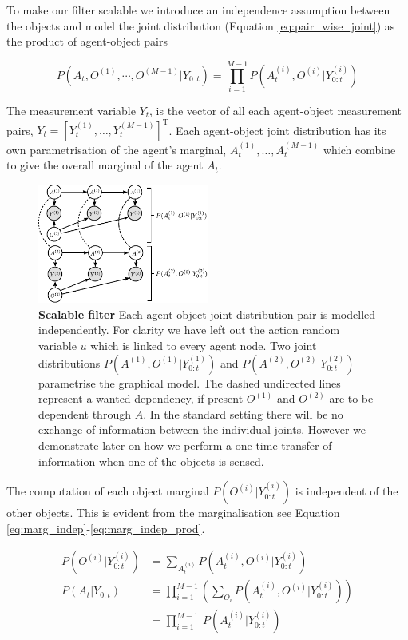 To make our filter scalable we introduce an independence assumption between the objects and model the joint distribution (Equation \ref{eq:pair_wise_joint}) as the product 
of agent-object pairs

\begin{equation}\label{eq:pair_wise_joint}
 P(A_t,O^{(1)},\cdots,O^{(M-1)}|Y_{0:t}) = \prod\limits_{i=1}^{M-1} P(A^{(i)}_t,O^{(i)}|Y^{(i)}_{0:t})
\end{equation}

The measurement variable $Y_t$, is the vector of all each agent-object 
measurement pairs, $Y_t = \left[Y^{(1)}_t,\dots,Y^{(M-1)}_t\right]^{\mathrm{T}}$. Each agent-object joint distribution has its own parametrisation of the agent's marginal,
$A^{(1)}_t,\dots,A^{(M-1)}_t$ which combine to give the overall marginal of the agent $A_t$.

\begin{figure}
\centering
  \includegraphics[width=0.5\textwidth]{./ch5-MLMF/Figures/Figure9.pdf}
  \caption{\textbf{Scalable filter} Each agent-object joint distribution pair is modelled independently. For clarity we have left 
  out the action random variable $u$ which is linked to every agent node.
  Two joint distributions $P(A^{(1)},O^{(1)}|Y^{(1)}_{0:t})$   and $P(A^{(2)},O^{(2)}|Y^{(2)}_{0:t})$ parametrise the graphical model. 
  The dashed undirected lines represent a wanted dependency, if present $O^{(1)}$ and $O^{(2)}$ are to be dependent through $A$. In
  the standard setting there will be no exchange of information between the individual joints. However we demonstrate later on how
  we perform a one time transfer of information when one of the objects is sensed.}
  \label{fig:scalable_mlmf_dae}
\end{figure}

The computation of each object marginal $P(O^{(i)}|Y^{(i)}_{0:t})$ is independent of the other objects. This is evident from the marginalisation 
see Equation \ref{eq:marg_indep}-\ref{eq:marg_indep_prod}.

\begin{align}
 P(O^{(i)}|Y^{(i)}_{0:t}) &= \sum\limits_{A^{(i)}_t} P(A^{(i)}_t,O^{(i)}|Y^{(i)}_{0:t}) \label{eq:marg_indep} \\
 P(A_t|Y_{0:t})   &= \prod\limits_{i=1}^{M-1} \left(\sum\limits_{O_i} P(A^{(i)}_t,O^{(i)}|Y^{(i)}_{0:t})\right)  \\
	    &= \prod\limits_{i=1}^{M-1} \ P(A^{(i)}_t|Y^{(i)}_{0:t}) \label{eq:marg_indep_prod}
\end{align}

